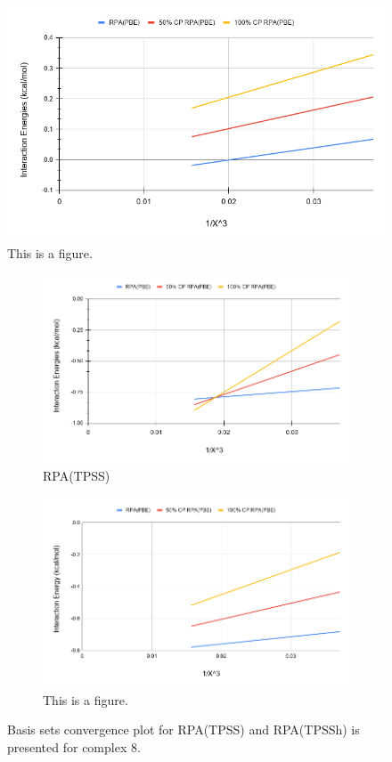 \documentclass[11pt]{article}
\begin{document}
\begin{figure}[hbpt]
  \includegraphics[scale=0.5]{tpss_1.png}
  \caption{This is a figure.}
  \label{fig:<name>}
\end{figure}

\begin{figure}[hbpt]
  \centering
  \begin{subfigure}{\textwidth}
    \center
    \includegraphics[scale=0.45]{tpss_8.png}
    \caption{RPA(TPSS)}
    \label{fig:tpss_8}
  \end{subfigure}
  \begin{subfigure}{\textwidth}
    \center
    \includegraphics[scale=0.45]{tpssh_8.png}
    \caption{This is a figure.}
    \label{fig:tpssh_8}
  \end{subfigure}
  \caption{Basis sets convergence plot for RPA(TPSS) and RPA(TPSSh) is
    presented for complex 8.}
  \label{fig:complex_8}
\end{figure}
\end{document}
